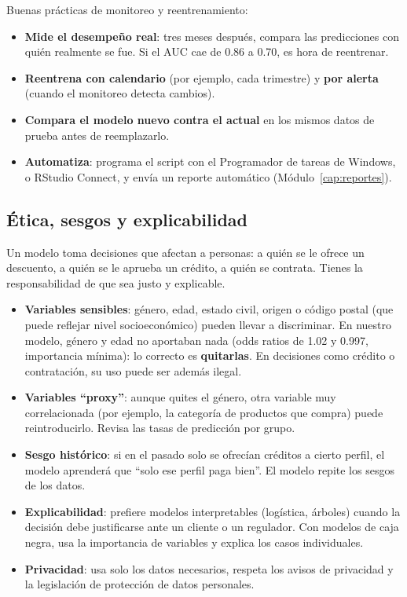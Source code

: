 Buenas prácticas de monitoreo y reentrenamiento:

\begin{itemize}
  \item \textbf{Mide el desempeño real}: tres meses después, compara las
        predicciones con quién realmente se fue. Si el AUC cae de 0.86 a 0.70,
        es hora de reentrenar.
  \item \textbf{Reentrena con calendario} (por ejemplo, cada trimestre) y
        \textbf{por alerta} (cuando el monitoreo detecta cambios).
  \item \textbf{Compara el modelo nuevo contra el actual} en los mismos datos
        de prueba antes de reemplazarlo.
  \item \textbf{Automatiza}: programa el script con el Programador de tareas
        de Windows,  o RStudio Connect, y envía un reporte
        automático (Módulo~\ref{cap:reportes}).
\end{itemize}

\subsection{Ética, sesgos y explicabilidad}

Un modelo toma decisiones que afectan a personas: a quién se le ofrece un
descuento, a quién se le aprueba un crédito, a quién se contrata. Tienes la
responsabilidad de que sea justo y explicable.

\begin{itemize}
  \item \textbf{Variables sensibles}: género, edad, estado civil, origen o
        código postal (que puede reflejar nivel socioeconómico) pueden llevar
        a discriminar. En nuestro modelo, género y edad no aportaban nada
        (odds ratios de 1.02 y 0.997, importancia mínima): lo correcto es
        \textbf{quitarlas}. En decisiones como crédito o contratación, su uso
        puede ser además ilegal.
  \item \textbf{Variables ``proxy''}: aunque quites el género, otra variable
        muy correlacionada (por ejemplo, la categoría de productos que compra)
        puede reintroducirlo. Revisa las tasas de predicción por grupo.
  \item \textbf{Sesgo histórico}: si en el pasado solo se ofrecían créditos a
        cierto perfil, el modelo aprenderá que ``solo ese perfil paga bien''.
        El modelo repite los sesgos de los datos.
  \item \textbf{Explicabilidad}: prefiere modelos interpretables (logística,
        árboles) cuando la decisión debe justificarse ante un cliente o un
        regulador. Con modelos de caja negra, usa la importancia de variables
        y explica los casos individuales.
  \item \textbf{Privacidad}: usa solo los datos necesarios, respeta los avisos
        de privacidad y la legislación de protección de datos personales.
\end{itemize}

